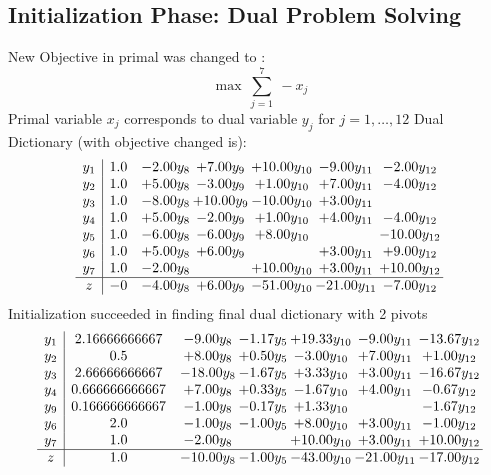 \documentclass[9pt]{article}
\begin{document}
\subsection{Initialization Phase: Dual Problem Solving}
New Objective in primal was changed to : \[ \max\ \sum_{j=1}^{7}\ - x_j \] 
Primal variable $x_j$ corresponds to dual variable $y_j$ for $j = 1,\ldots,12$
Dual Dictionary (with objective changed is): 
\[\begin{array}{c| c c@{\hskip 2pt} c@{\hskip 2pt} c@{\hskip 2pt} c@{\hskip 2pt} c@{\hskip 2pt} }
 y_{1}   &  1.0 & -2.00 y_{8} & +  7.00 y_{9} & + 10.00 y_{10} & -9.00 y_{11} & -2.00 y_{12}\\
 y_{2}   &  1.0 & +  5.00 y_{8} & -3.00 y_{9} & +  1.00 y_{10} & +  7.00 y_{11} & -4.00 y_{12}\\
 y_{3}   &  1.0 & -8.00 y_{8} & + 10.00 y_{9} & -10.00 y_{10} & +  3.00 y_{11} &   \\
 y_{4}   &  1.0 & +  5.00 y_{8} & -2.00 y_{9} & +  1.00 y_{10} & +  4.00 y_{11} & -4.00 y_{12}\\
 y_{5}   &  1.0 & -6.00 y_{8} & -6.00 y_{9} & +  8.00 y_{10} &   & -10.00 y_{12}\\
 y_{6}   &  1.0 & +  5.00 y_{8} & +  6.00 y_{9} &   & +  3.00 y_{11} & +  9.00 y_{12}\\
 y_{7}   &  1.0 & -2.00 y_{8} &   & + 10.00 y_{10} & +  3.00 y_{11} & + 10.00 y_{12}\\
\hline
z    &  -0 & -4.00 y_{8} & +  6.00 y_{9} & -51.00 y_{10} & -21.00 y_{11} & -7.00 y_{12}\\
\end{array}\]
Initialization succeeded in finding final dual dictionary with 2 pivots
\[\begin{array}{c| c c@{\hskip 2pt} c@{\hskip 2pt} c@{\hskip 2pt} c@{\hskip 2pt} c@{\hskip 2pt} }
 y_{1}   &  2.16666666667 & -9.00 y_{8} & -1.17 y_{5} & + 19.33 y_{10} & -9.00 y_{11} & -13.67 y_{12}\\
 y_{2}   &  0.5 & +  8.00 y_{8} & +  0.50 y_{5} & -3.00 y_{10} & +  7.00 y_{11} & +  1.00 y_{12}\\
 y_{3}   &  2.66666666667 & -18.00 y_{8} & -1.67 y_{5} & +  3.33 y_{10} & +  3.00 y_{11} & -16.67 y_{12}\\
 y_{4}   &  0.666666666667 & +  7.00 y_{8} & +  0.33 y_{5} & -1.67 y_{10} & +  4.00 y_{11} & -0.67 y_{12}\\
 y_{9}   &  0.166666666667 & -1.00 y_{8} & -0.17 y_{5} & +  1.33 y_{10} &   & -1.67 y_{12}\\
 y_{6}   &  2.0 & -1.00 y_{8} & -1.00 y_{5} & +  8.00 y_{10} & +  3.00 y_{11} & -1.00 y_{12}\\
 y_{7}   &  1.0 & -2.00 y_{8} &   & + 10.00 y_{10} & +  3.00 y_{11} & + 10.00 y_{12}\\
\hline
z    &  1.0 & -10.00 y_{8} & -1.00 y_{5} & -43.00 y_{10} & -21.00 y_{11} & -17.00 y_{12}\\
\end{array}\]
\end{document}
